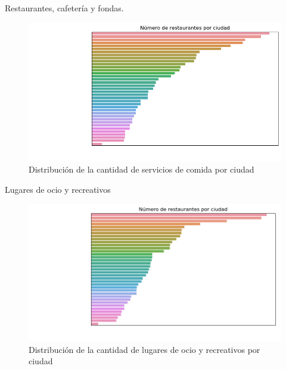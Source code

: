 \begin{frame}{Restaurantes, cafetería y fondas.}
\begin{figure}
    \centering
    \includegraphics[scale=0.5]{figure/restaurantes.png}
    \caption{Distribución de la cantidad de servicios de comida por ciudad}
    \label{fig:restaurantes}
\end{figure}
\end{frame}

\begin{frame}{Lugares de ocio y recreativos}
    \begin{figure}
        \centering
        \includegraphics[scale=0.5]{figure/ocio.png}
        \caption{Distribución de la cantidad de lugares de ocio y recreativos por ciudad}
        \label{fig:ocio}
    \end{figure}
\end{frame}

